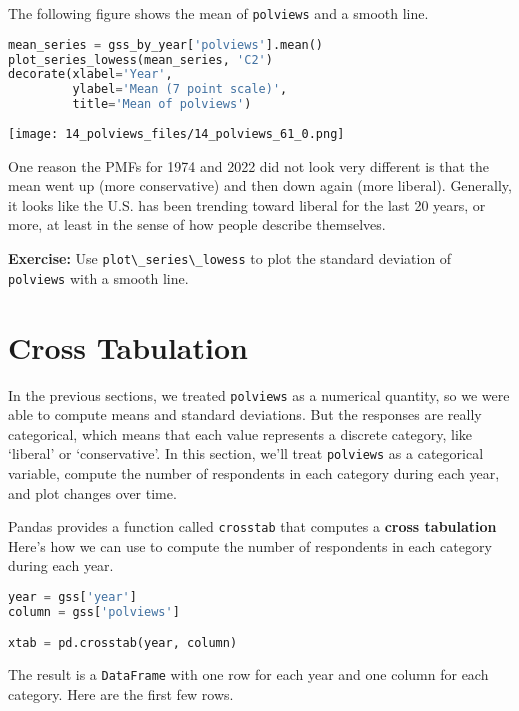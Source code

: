The following figure shows the mean of
\passthrough{\lstinline!polviews!} and a smooth line.

\begin{lstlisting}[language=Python,style=source]
mean_series = gss_by_year['polviews'].mean()
plot_series_lowess(mean_series, 'C2')
decorate(xlabel='Year',
         ylabel='Mean (7 point scale)',
         title='Mean of polviews')
\end{lstlisting}

\begin{center}
\texttt{[image: 14\_polviews\_files/14\_polviews\_61\_0.png]}
\end{center}

One reason the PMFs for 1974 and 2022 did not look very different is
that the mean went up (more conservative) and then down again (more
liberal). Generally, it looks like the U.S. has been trending toward
liberal for the last 20 years, or more, at least in the sense of how
people describe themselves.

\textbf{Exercise:} Use \passthrough{\lstinline!plot\_series\_lowess!} to
plot the standard deviation of \passthrough{\lstinline!polviews!} with a
smooth line.

\section{Cross Tabulation}\label{cross-tabulation}

In the previous sections, we treated \passthrough{\lstinline!polviews!}
as a numerical quantity, so we were able to compute means and standard
deviations. But the responses are really categorical, which means that
each value represents a discrete category, like `liberal' or
`conservative'. In this section, we'll treat
\passthrough{\lstinline!polviews!} as a categorical variable, compute
the number of respondents in each category during each year, and plot
changes over time.

Pandas provides a function called \passthrough{\lstinline!crosstab!}
that computes a \textbf{cross tabulation} Here's how we can use to
compute the number of respondents in each category during each year.

\begin{lstlisting}[language=Python,style=source]
year = gss['year']
column = gss['polviews']

xtab = pd.crosstab(year, column)
\end{lstlisting}

The result is a \passthrough{\lstinline!DataFrame!} with one row for
each year and one column for each category. Here are the first few rows.

